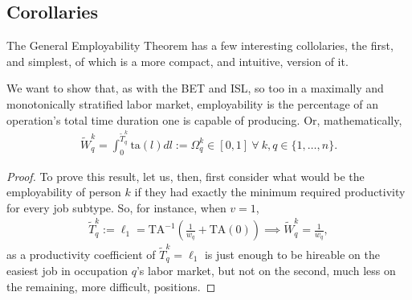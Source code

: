 \documentclass[hidelinks, nonatbib]{elsarticle}
\begin{document}
\subsection{Corollaries}
The General Employability Theorem has a few interesting collolaries, the first, and simplest, of which is a more compact, and intuitive, version of it.
\begin{corollary}
    We want to show that, as with the BET and ISL, so too in a maximally and monotonically stratified labor market, employability is the percentage of an operation's total time duration one is capable of producing. Or, mathematically,
    \begin{gather}
        \tilde{W}_{q}^{k}
        =
        \int_{0}^{\tilde{T}_{q}^{k}}
        \text{ta}(l)
        dl
        :=
        \Omega_{q}^{k}
        \in 
        [0,1]
        \
        \forall
        \
        k,q \in \{1, \dots, n\}
        .
    \end{gather}

    \begin{proof}
        To prove this result, let us, then, first consider what would be the employability of person $k$ if they had exactly the minimum required productivity for every job subtype. So, for instance, when $v = 1$,
        \begin{align}
            \tilde{T}_{q}^{k}
            :=
            \ell_1
            =
            \text{TA}^{-1}
            \left(
                \frac{1}{w_q}
                +
                \text{TA}(0)
            \right)
            \implies
            \tilde{W}_{q}^{k}
            =
            \frac{1}{w_q}
            ,
        \end{align}
        as a productivity coefficient of $\tilde{T}_{q}^{k} = \ell_1$ is just enough to be hireable on the easiest job in occupation $q$'s labor market, but not on the second, much less on the remaining, more difficult, positions.
        

\end{proof}
\end{corollary}
\end{document}
